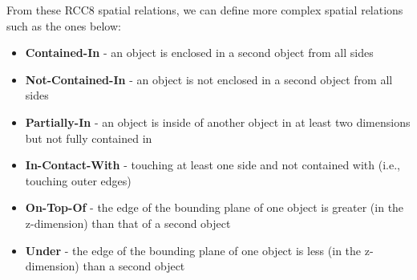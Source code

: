 \documentclass[final,1p,times]{elsarticle}
\newcommand{\sr}[1] {\textbf{#1}}
\begin{document}
From these RCC8 spatial relations, we can define more complex spatial relations such as the ones below:
\begin{itemize}
  \item \sr{Contained-In} - an object is enclosed in a second object from all sides
  \item \sr{Not-Contained-In} - an object is not enclosed in a second object from all sides
  \item \sr{Partially-In} - an object is inside of another object in at least two dimensions but not fully contained in
  \item \sr{In-Contact-With} - touching at least one side and not contained with (i.e., touching outer edges)
  \item \sr{On-Top-Of} - the edge of the bounding plane of one object is greater (in the z-dimension) than that of a second object
  \item \sr{Under} - the edge of the bounding plane of one object is less (in the z-dimension) than a second object
\end{itemize}
\end{document}
